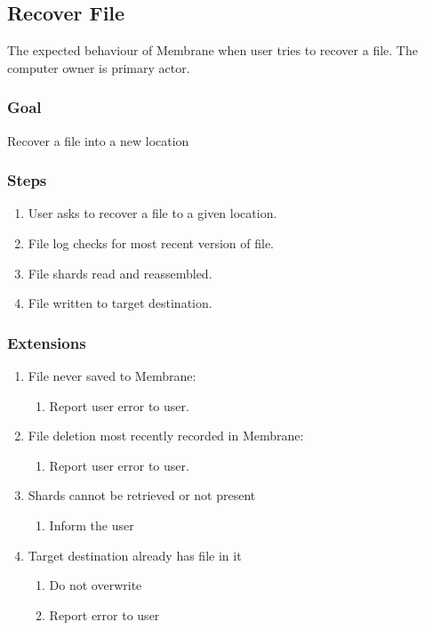 \documentclass[11pt, a4paper, twocolumn, twoside]{report}
\begin{document}
\subsection{Recover File}

The expected behaviour of Membrane when user tries to recover a file. The computer owner is primary actor.

\subsubsection{Goal}

Recover a file into a new location

\subsubsection{Steps}

\begin{enumerate}
 \item User asks to recover a file to a given location.
 \item File log checks for most recent version of file.
 \item File shards read and reassembled.
 \item File written to target destination.
\end{enumerate}

\subsubsection{Extensions}
\begin{enumerate}
  \item File never saved to Membrane:
	\begin{enumerate}
	  \item Report user error to user.
	\end{enumerate}
  \item File deletion most recently recorded in Membrane:
	\begin{enumerate}
	  \item Report user error to user.
	\end{enumerate}
  \item Shards cannot be retrieved or not present
	\begin{enumerate}
	  \item Inform the user
	\end{enumerate}
  \item Target destination already has file in it
	\begin{enumerate}
	  \item Do not overwrite
	  \item Report error to user
	\end{enumerate}
\end{enumerate}
\end{document}

